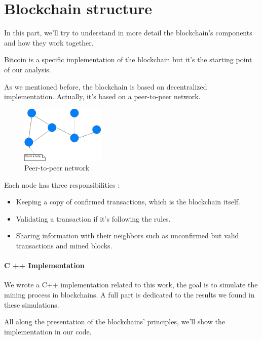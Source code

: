 \section{Blockchain structure}

In this part, we'll try to understand in more detail the blockchain's components and how they work together.

Bitcoin is a specific implementation of the blockchain but it's the starting point of our analysis. \newline

As we mentioned before, the blockchain is based on decentralized implementation. Actually, it's based on a peer-to-peer network.

\begin{figure}[ht]
\centering
\includegraphics[width=4cm]{Figures/network}
\caption{Peer-to-peer network}
\end{figure}
\medskip

Each node has three responsibilities :

\begin{itemize}
  \item Keeping a copy of confirmed transactions, which is the blockchain itself.
  \item Validating a transaction if it's following the rules.
  \item Sharing information with their neighbors such as unconfirmed but valid transactions and mined blocks.
\end{itemize}

\clearpage

\begin{aside}

\paragraph{C ++ Implementation}

We wrote a C++ implementation related to this work, the goal is to simulate the mining process in blockchains. A full part is dedicated to the results we found in these simulations. \newline

All along the presentation of the blockchains' principles, we'll show the implementation in our code.

\end{aside}



